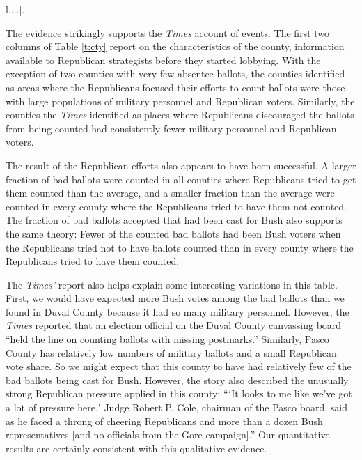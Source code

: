 \documentclass[11pt,titlepage]{article}
\begin{document}
\begin{table}[t]
\begin{center}
\begin{tabular}{l....|.}
    \hline                                                       
  \end{tabular}                                                
  \caption{Counties classified by whether the \emph{New York Times} 
    reported evidence of Republican pressure to count or not count the
    overseas absentee ballots, compared to an average for the
    remaining counties not mentioned.  Averages are weighted by the
    number of ballots. $^a$The percent of bad ballots that arrived
    with local election officials and were included in the official
    count.}
  \label{t:cty}
\end{center}                                                 
\end{table}

The evidence strikingly supports the \emph{Times} account of events.
The first two columns of Table \ref{t:cty} report on the
characteristics of the county, information available to Republican
strategists before they started lobbying.  With the exception of two
counties with very few absentee ballots, the counties identified as
areas where the Republicans focused their efforts to count ballots
were those with large populations of military personnel and Republican
voters.  Similarly, the counties the \emph{Times} identified as
places where Republicans discouraged the ballots from being counted
had consistently fewer military personnel and Republican voters.

The result of the Republican efforts also appears to have been
successful.  A larger fraction of bad ballots were counted in all
counties where Republicans tried to get them counted than the average,
and a smaller fraction than the average were counted in every county
where the Republicans tried to have them not counted.  
The fraction of bad ballots accepted that had been cast for Bush also
supports the same theory: Fewer of the counted bad ballots had been
Bush voters when the Republicans tried not to have ballots counted
than in every county where the Republicans tried to have them counted.

The \emph{Times'} report also helps explain some interesting
variations in this table.  First, we would have expected more Bush
votes among the bad ballots than we found in Duval County because it
had so many military personnel.  However, the \emph{Times} reported
that an election official on the Duval County canvassing board ``held
the line on counting ballots with missing postmarks.''  Similarly,
Pasco County has relatively low numbers of military ballots and a
small Republican vote share.  So we might expect that this county to
have had relatively few of the bad ballots being cast for Bush.
However, the story also described the unusually strong Republican
pressure applied in this county: ```It looks to me like we've got a
lot of pressure here,' Judge Robert P.  Cole, chairman of the Pasco
board, said as he faced a throng of cheering Republicans and more than
a dozen Bush representatives [and no officials from the Gore
campaign].''  Our quantitative results are certainly consistent with
this qualitative evidence.
\end{document}
